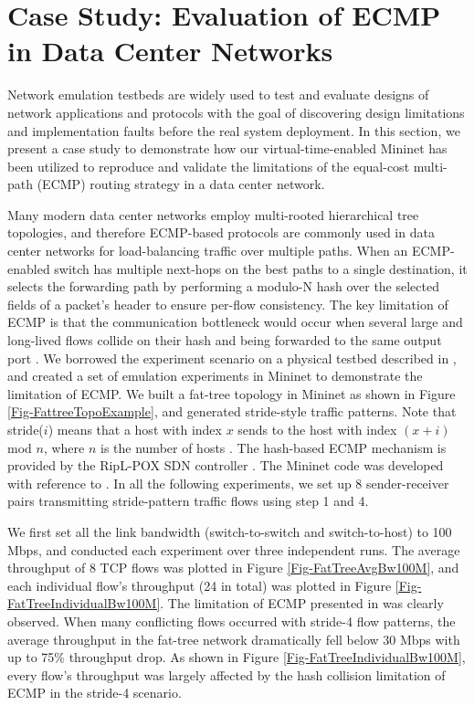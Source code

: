 \section{Case Study: Evaluation of ECMP in Data Center Networks}
\label{Sec-CaseStudy}
Network emulation testbeds are widely used to test and evaluate designs of network applications and protocols with the goal of discovering design limitations and implementation faults before the real system deployment. In this section, we present a case study to demonstrate how our virtual-time-enabled Mininet has been utilized to reproduce and validate the limitations of the equal-cost multi-path (ECMP) routing strategy in a data center network.

Many modern data center networks employ multi-rooted hierarchical tree topologies, and therefore ECMP-based protocols \cite{ECMP} are commonly used in data center networks for load-balancing traffic over multiple paths. When an ECMP-enabled switch has multiple next-hops on the best paths to a single destination, it selects the forwarding path by performing a modulo-N hash over the selected fields of a packet's header to ensure per-flow consistency. The key limitation of ECMP is that the communication bottleneck would occur when several large and long-lived flows collide on their hash and being forwarded to the same output port \cite{Hedera}. We borrowed the experiment scenario on a physical testbed described in \cite{Hedera}, and created a set of emulation experiments in Mininet to demonstrate the limitation of ECMP. We built a fat-tree topology in Mininet as shown in Figure \ref{Fig-FattreeTopoExample}, and generated stride-style traffic patterns. Note that stride($i$) means that a host with index $x$ sends to the host with index $(x + i)$ mod $n$, where $n$ is the number of hosts \cite{Hedera}. The hash-based ECMP mechanism is provided by the RipL-POX SDN controller \cite{RipLPox}. The Mininet code was developed with reference to \cite{ReproNetReserch}. In all the following experiments, we set up 8 sender-receiver pairs transmitting stride-pattern traffic flows using step 1 and 4.

\begin{figure*}[htbp]
\centering
{}
\caption{\textbf{A Data Center Network with a Degree-4 Fat Tree Topology}}
\label{Fig-FattreeTopoExample}
\end{figure*}

We first set all the link bandwidth (switch-to-switch and switch-to-host) to 100 Mbps, and conducted each experiment over three independent runs. The average throughput of 8 TCP flows was plotted in Figure \ref{Fig-FatTreeAvgBw100M}, and each individual flow's throughput (24 in total) was plotted in Figure \ref{Fig-FatTreeIndividualBw100M}. The limitation of ECMP presented in \cite{Hedera} was clearly observed. When many conflicting flows occurred with stride-4 flow patterns, the average throughput in the fat-tree network dramatically fell below 30 Mbps with up to 75\% throughput drop. As shown in Figure \ref{Fig-FatTreeIndividualBw100M}, every flow's throughput was largely affected by the hash collision limitation of ECMP in the stride-4 scenario.


